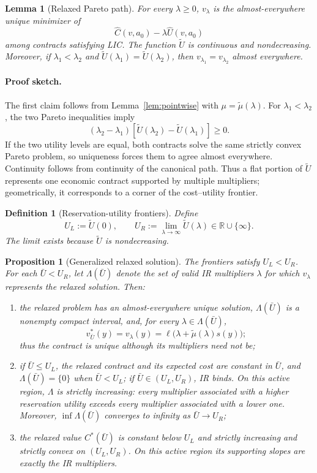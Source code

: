 \documentclass[11pt]{article}
\newtheorem{proposition}{Proposition}
\newtheorem{lemma}{Lemma}
\newtheorem{definition}{Definition}
\theoremstyle{remark}
\newcommand{\R}{\mathbb R}
\newcommand{\proofsketch}{\paragraph{Proof sketch.}}
\begin{document}
\begin{lemma}[Relaxed Pareto path]
\label{lem:pareto-path}
For every $\lambda\ge0$, $v_\lambda$ is the almost-everywhere
unique minimizer of
\[
 \widehat C(v,a_0)-\lambda\widehat U(v,a_0)
\]
among contracts satisfying LIC.  The function $\widetilde U$ is continuous and
nondecreasing.  Moreover, if $\lambda_1<\lambda_2$ and
$\widetilde U(\lambda_1)=\widetilde U(\lambda_2)$, then
$v_{\lambda_1}=v_{\lambda_2}$ almost everywhere.
\end{lemma}

\proofsketch
The first claim follows from Lemma~\ref{lem:pointwise} with
$\mu=\widetilde\mu(\lambda)$.  For $\lambda_1<\lambda_2$, the two Pareto inequalities
imply
\[
 (\lambda_2-\lambda_1)
 [\widetilde U(\lambda_2)-\widetilde U(\lambda_1)]\ge0.
\]
If the two utility levels are equal, both contracts solve the same strictly
convex Pareto problem, so uniqueness forces them to agree almost everywhere.
Continuity follows from continuity of the canonical path.  Thus a flat portion
of $\widetilde U$ represents one economic contract supported by multiple
multipliers; geometrically, it corresponds to a corner of the cost--utility
frontier.

\begin{definition}[Reservation-utility frontiers]
Define
\[
 U_L:=\widetilde U(0),
 \qquad
 U_R:=\lim_{\lambda\to\infty}\widetilde U(\lambda)
 \in\R\cup\{\infty\}.
\]
The limit exists because $\widetilde U$ is nondecreasing.
\end{definition}

\begin{proposition}[Generalized relaxed solution]
\label{prop:relaxed-solution}
The frontiers satisfy $U_L<U_R$.  For each $\bar U<U_R$, let
$\Lambda(\bar U)$ denote the set of valid IR multipliers $\lambda$ for which
$v_\lambda$ represents the relaxed solution.  Then:
\begin{enumerate}[label=(\roman*)]
 \item the relaxed problem has an almost-everywhere unique solution,
 $\Lambda(\bar U)$ is a nonempty compact interval, and, for every
 $\lambda\in\Lambda(\bar U)$,
 \[
  v^*_{\bar U}(y)
  =v_\lambda(y)
  =\ell\bigl(\lambda+\widetilde\mu(\lambda)s(y)\bigr);
 \]
 thus the contract is unique although its multipliers need not be;
 \item if $\bar U\le U_L$, the relaxed contract and its expected cost are
 constant in $\bar U$, and $\Lambda(\bar U)=\{0\}$ when $\bar U<U_L$; if
 $\bar U\in(U_L,U_R)$, IR binds.  On this active region, $\Lambda$ is strictly
 increasing: every multiplier associated with a higher reservation utility
 exceeds every multiplier associated with a lower one.  Moreover,
 $\inf\Lambda(\bar U)$ converges to infinity as $\bar U\to U_R$;
 \item the relaxed value $C^*(\bar U)$ is constant below $U_L$ and strictly
 increasing and strictly convex on $(U_L,U_R)$.  On this active region its
 supporting slopes are exactly the IR multipliers.
\end{enumerate}
\end{proposition}
\end{document}
